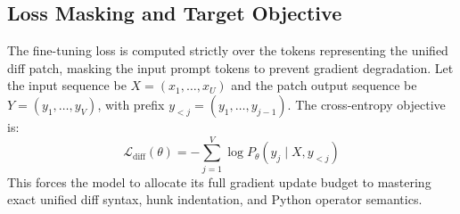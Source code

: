 \documentclass[10pt,twocolumn,letterpaper]{article}
\begin{document}
\begin{table}[htbp]
\centering
\small
\caption{LoRA Fine-Tuning Hyperparameters.}
\label{tab:lora_params}
\end{table}

\subsection{Loss Masking and Target Objective}
The fine-tuning loss is computed strictly over the tokens representing the unified diff patch, masking the input prompt tokens to prevent gradient degradation. Let the input sequence be $X = (x_1, \dots, x_U)$ and the patch output sequence be $Y = (y_1, \dots, y_V)$, with prefix $y_{<j} = (y_1, \dots, y_{j-1})$. The cross-entropy objective is:
\begin{equation}
    \mathcal{L}_{\text{diff}}(\theta) = - \sum_{j=1}^V \log P_\theta(y_j \mid X, y_{<j})
\end{equation}
This forces the model to allocate its full gradient update budget to mastering exact unified diff syntax, hunk indentation, and Python operator semantics.
\end{document}
